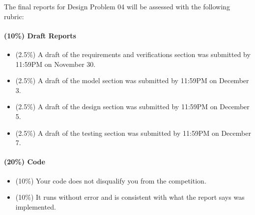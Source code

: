\documentclass[12pt]{article}
\begin{document}
\noindent
The final reports for Design Problem 04 will be assessed with the following rubric:

\paragraph{(10\%) Draft Reports}
\begin{itemize}

\item (2.5\%) A draft of the requirements and verifications section was submitted by 11:59PM on November 30.

\item (2.5\%) A draft of the model section was submitted by 11:59PM on December 3.

\item (2.5\%) A draft of the design section was submitted by 11:59PM on December 5.

\item (2.5\%) A draft of the testing section was submitted by 11:59PM on December 7.
\end{itemize}



\paragraph{(20\%) Code}
\begin{itemize}

\item (10\%) Your code does not disqualify you from the competition.
\item (10\%) It runs without error and is consistent with what the report says was implemented.

\end{itemize}
\end{document}
